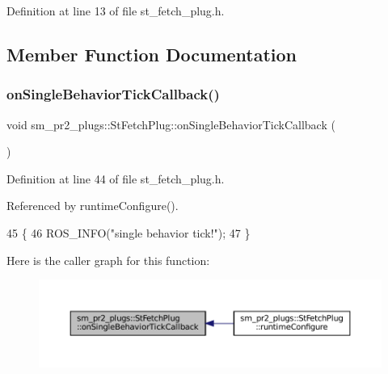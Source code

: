 Definition at line 13 of file st\+\_\+fetch\+\_\+plug.\+h.



\subsection{Member Function Documentation}
\mbox{\label{structsm__pr2__plugs_1_1StFetchPlug_ae3dc2c0827bd1adb046f000e1caa4c4c}} 
\subsubsection{\texorpdfstring{on\+Single\+Behavior\+Tick\+Callback()}{onSingleBehaviorTickCallback()}}
{\footnotesize\ttfamily void sm\+\_\+pr2\+\_\+plugs\+::\+St\+Fetch\+Plug\+::on\+Single\+Behavior\+Tick\+Callback (\begin{DoxyParamCaption}{ }\end{DoxyParamCaption})\hspace{0.3cm}{\ttfamily [inline]}}



Definition at line 44 of file st\+\_\+fetch\+\_\+plug.\+h.



Referenced by runtime\+Configure().


\begin{DoxyCode}
45     \{
46         ROS\_INFO(\textcolor{stringliteral}{"single behavior tick!"});
47     \}
\end{DoxyCode}
Here is the caller graph for this function\+:
\nopagebreak
\begin{figure}[H]
\begin{center}
\leavevmode
\includegraphics[width=350pt]{structsm__pr2__plugs_1_1StFetchPlug_ae3dc2c0827bd1adb046f000e1caa4c4c_icgraph}
\end{center}
\end{figure}
\mbox{\label{structsm__pr2__plugs_1_1StFetchPlug_aaf8460a7e96dfbfe7eefbd3f2fd41b41}} 
